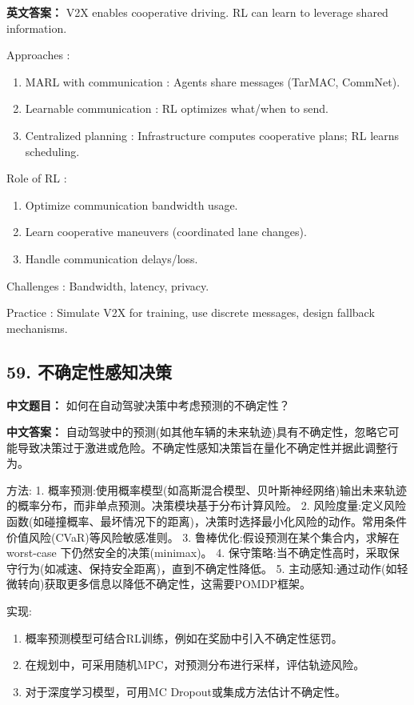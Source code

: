 \documentclass[10pt,a4paper]{ctexart}
\begin{document}
\textbf{英文答案：}  
V2X enables cooperative driving. RL can learn to leverage shared information.

 Approaches :
\begin{enumerate}
    \item MARL with communication : Agents share messages (TarMAC, CommNet).
    \item Learnable communication : RL optimizes what/when to send.
    \item Centralized planning : Infrastructure computes cooperative plans; RL learns scheduling.
\end{enumerate}

 Role of RL :
\begin{enumerate}
    \item Optimize communication bandwidth usage.
    \item Learn cooperative maneuvers (coordinated lane changes).
    \item Handle communication delays/loss.
\end{enumerate}

 Challenges : Bandwidth, latency, privacy.

 Practice : Simulate V2X for training, use discrete messages, design fallback mechanisms.

\subsection*{59. 不确定性感知决策}
\textbf{中文题目：} 如何在自动驾驶决策中考虑预测的不确定性？

\textbf{中文答案：}  
自动驾驶中的预测(如其他车辆的未来轨迹)具有不确定性，忽略它可能导致决策过于激进或危险。不确定性感知决策旨在量化不确定性并据此调整行为。

 方法:
1.  概率预测:使用概率模型(如高斯混合模型、贝叶斯神经网络)输出未来轨迹的概率分布，而非单点预测。决策模块基于分布计算风险。
2.  风险度量:定义风险函数(如碰撞概率、最坏情况下的距离)，决策时选择最小化风险的动作。常用条件价值风险(CVaR)等风险敏感准则。
3.  鲁棒优化:假设预测在某个集合内，求解在 worst-case 下仍然安全的决策(minimax)。
4.  保守策略:当不确定性高时，采取保守行为(如减速、保持安全距离)，直到不确定性降低。
5.  主动感知:通过动作(如轻微转向)获取更多信息以降低不确定性，这需要POMDP框架。

 实现:
\begin{enumerate}
    \item 概率预测模型可结合RL训练，例如在奖励中引入不确定性惩罚。
    \item 在规划中，可采用随机MPC，对预测分布进行采样，评估轨迹风险。
    \item 对于深度学习模型，可用MC Dropout或集成方法估计不确定性。
\end{enumerate}
\end{document}

